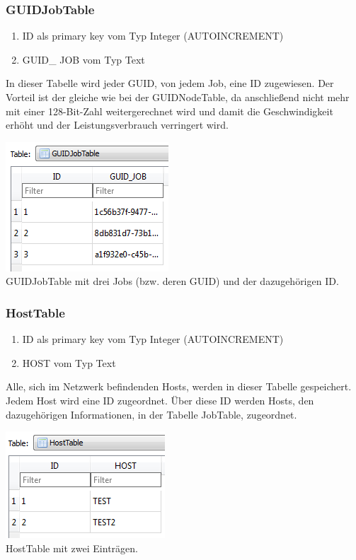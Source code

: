 \documentclass[12pt,a4paper]{report}
\begin{document}
\begin{onehalfspace}
\subsubsection{GUIDJobTable}
\begin{enumerate}
\item ID als primary key vom Typ Integer (AUTOINCREMENT)
\item GUID\_ JOB vom Typ Text
\end{enumerate}
In dieser Tabelle wird jeder GUID, von jedem Job, eine ID zugewiesen. Der Vorteil ist der gleiche wie bei der GUIDNodeTable, da anschließend nicht mehr mit einer 128-Bit-Zahl weitergerechnet wird und damit die Geschwindigkeit erhöht und der Leistungsverbrauch verringert wird.
\begin{center}
\includegraphics[scale=0.8]{img/db-tb-guid-job.png}\\
GUIDJobTable mit drei Jobs (bzw. deren GUID) und der dazugehörigen ID. 
\end{center}
\subsubsection{HostTable}
\begin{enumerate}
\item ID als primary key vom Typ Integer (AUTOINCREMENT)
\item HOST vom Typ Text
\end{enumerate}
Alle, sich im Netzwerk befindenden Hosts, werden in dieser Tabelle gespeichert. Jedem Host wird eine ID zugeordnet. Über diese ID werden Hosts, den dazugehörigen Informationen, in der Tabelle JobTable, zugeordnet.
\begin{center}
\includegraphics[scale=0.8]{img/db-tb-host.png}\\
HostTable mit zwei Einträgen.
\end{center}

\end{onehalfspace}
\end{document}
